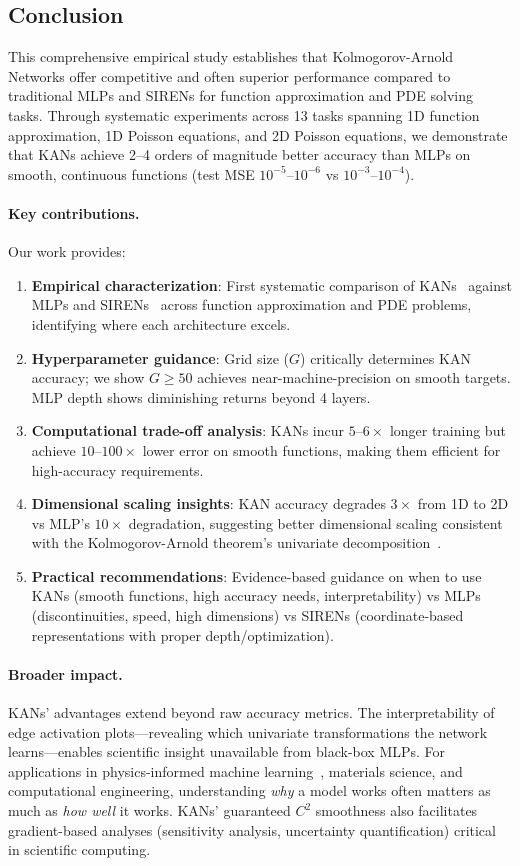 \documentclass[11pt,a4paper]{article}
\begin{document}
\subsection{Conclusion}

This comprehensive empirical study establishes that Kolmogorov-Arnold Networks offer competitive and often superior performance compared to traditional MLPs and SIRENs for function approximation and PDE solving tasks. Through systematic experiments across 13 tasks spanning 1D function approximation, 1D Poisson equations, and 2D Poisson equations, we demonstrate that KANs achieve 2--4 orders of magnitude better accuracy than MLPs on smooth, continuous functions (test MSE $10^{-5}$--$10^{-6}$ vs $10^{-3}$--$10^{-4}$).

\paragraph{Key contributions.} Our work provides:
\begin{enumerate}
    \item \textbf{Empirical characterization}: First systematic comparison of KANs~\citep{liu2024kan} against MLPs and SIRENs~\citep{sitzmann2020implicit} across function approximation and PDE problems, identifying where each architecture excels.
    \item \textbf{Hyperparameter guidance}: Grid size ($G$) critically determines KAN accuracy; we show $G \geq 50$ achieves near-machine-precision on smooth targets. MLP depth shows diminishing returns beyond 4 layers.
    \item \textbf{Computational trade-off analysis}: KANs incur $5$--$6\times$ longer training but achieve $10$--$100\times$ lower error on smooth functions, making them efficient for high-accuracy requirements.
    \item \textbf{Dimensional scaling insights}: KAN accuracy degrades $3\times$ from 1D to 2D vs MLP's $10\times$ degradation, suggesting better dimensional scaling consistent with the Kolmogorov-Arnold theorem's univariate decomposition~\citep{liu2024kan}.
    \item \textbf{Practical recommendations}: Evidence-based guidance on when to use KANs (smooth functions, high accuracy needs, interpretability) vs MLPs (discontinuities, speed, high dimensions) vs SIRENs (coordinate-based representations with proper depth/optimization).
\end{enumerate}

\paragraph{Broader impact.} KANs' advantages extend beyond raw accuracy metrics. The interpretability of edge activation plots—revealing which univariate transformations the network learns—enables scientific insight unavailable from black-box MLPs. For applications in physics-informed machine learning~\citep{raissi2019physics}, materials science, and computational engineering, understanding \emph{why} a model works often matters as much as \emph{how well} it works. KANs' guaranteed $C^2$ smoothness also facilitates gradient-based analyses (sensitivity analysis, uncertainty quantification) critical in scientific computing.
\end{document}
